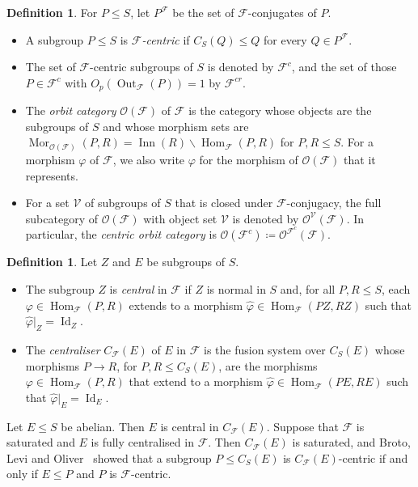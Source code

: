 \documentclass[10pt]{amsart}
\theoremstyle{definition}
\newtheorem{definition}[theorem]{Definition}
\DeclareMathOperator{\Out}{Out}
\DeclareMathOperator{\Hom}{Hom}
\DeclareMathOperator{\Mor}{Mor}
\numberwithin{equation}{section}
\renewcommand{\le}{\leqslant}
\newcommand{\F}{\mathcal F}
\newcommand{\Op}{\mathcal O}
\newcommand{\Inn}{\operatorname{Inn}}
\begin{document}
\begin{definition}
For $P\le S$, let $P^\F$ be the set of $\F$-conjugates of $P$.
\begin{itemize}
\item A subgroup $P\le S$ is \emph{$\F$-centric} if $C_S(Q)\le Q$ for every $Q\in P^\F$.
\item The set of $\F$-centric subgroups of $S$ is denoted by $\F^c$, and the set of those $P\in\F^c$ with $O_p(\Out_\F(P))=1$ by $\F^{cr}$.
\item The \emph{orbit category} $\Op(\F)$ of $\F$ is the category whose objects are the subgroups of $S$ and whose morphism sets are $\Mor_{\Op(\F)}(P,R)=\Inn(R)\backslash\Hom_\F(P,R)$ for $P,R\le S$. For a morphism $\varphi$ of $\F$, we also write $\varphi$ for the morphism of $\Op(\F)$ that it represents.
\item For a set $\mathcal V$ of subgroups of $S$ that is closed under $\F$-conjugacy, the full subcategory of $\Op(\F)$ with object set $\mathcal V$ is denoted by $\Op^{\mathcal V}(\F)$. In particular, the \emph{centric orbit category} is $\Op(\F^c)\coloneqq\Op^{\F^c}(\F)$.
\end{itemize}
\end{definition}

\begin{definition}
Let $Z$ and $E$ be subgroups of $S$.
\begin{itemize}
\item The subgroup $Z$ is \emph{central} in $\F$ if $Z$ is normal in $S$ and, for all $P,R\le S$, each ${\varphi\in\Hom_\F(P,R)}$ extends to a morphism $\widehat\varphi\in\Hom_\F(PZ,RZ)$ such that $\widehat\varphi|_Z=\operatorname{Id}_Z$.
\item The \emph{centraliser} $C_\F(E)$ of $E$ in $\F$ is the fusion system over $C_S(E)$ whose morphisms ${P\to R}$, for $P,R\le C_S(E)$, are the morphisms $\varphi\in\Hom_\F(P,R)$ that extend to a morphism ${\widehat\varphi\in\Hom_\F(PE,RE)}$ such that $\widehat\varphi|_E=\operatorname{Id}_E$.
\end{itemize}
\end{definition}

Let $E\le S$ be abelian. Then $E$ is central in $C_\F(E)$. Suppose that $\F$ is saturated and $E$ is fully centralised in $\F$. Then $C_\F(E)$ is saturated, and Broto, Levi and Oliver~\cite[Proposition~2.5(a)]{BLO} showed that a subgroup $P\le C_S(E)$ is $C_\F(E)$-centric if and only if $E\le P$ and $P$ is $\F$-centric.
\end{document}
